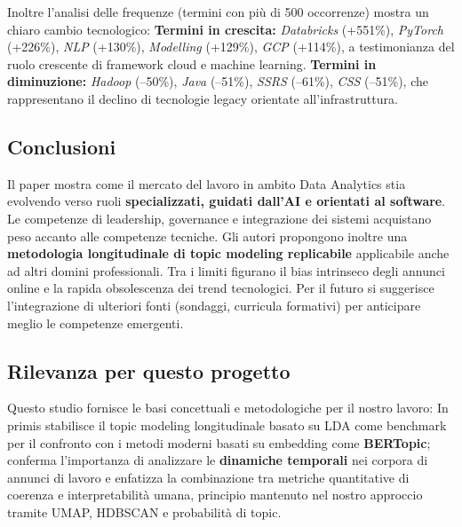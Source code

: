 Inoltre l'analisi delle frequenze (termini con più di 500 occorrenze) mostra un chiaro cambio tecnologico:
\noindent \textbf{Termini in crescita:} \textit{Databricks} (+551\%), \textit{PyTorch} (+226\%), \textit{NLP} (+130\%), \textit{Modelling} (+129\%), \textit{GCP} (+114\%), a testimonianza del ruolo crescente di framework cloud e machine learning.
\noindent \textbf{Termini in diminuzione:} \textit{Hadoop} (--50\%), \textit{Java} (--51\%), \textit{SSRS} (--61\%), \textit{CSS} (--51\%), che rappresentano il declino di tecnologie legacy orientate all'infrastruttura.

\subsection{Conclusioni}
Il paper mostra come il mercato del lavoro in ambito Data Analytics stia evolvendo verso ruoli \textbf{specializzati, guidati dall'AI e orientati al software}.
Le competenze di leadership, governance e integrazione dei sistemi acquistano peso accanto alle competenze tecniche.
Gli autori propongono inoltre una \textbf{metodologia longitudinale di topic modeling replicabile} applicabile anche ad altri domini professionali.
Tra i limiti figurano il bias intrinseco degli annunci online e la rapida obsolescenza dei trend tecnologici.
Per il futuro si suggerisce l'integrazione di ulteriori fonti (sondaggi, curricula formativi) per anticipare meglio le competenze emergenti.

\subsection{Rilevanza per questo progetto}
Questo studio fornisce le basi concettuali e metodologiche per il nostro lavoro:
In primis stabilisce il topic modeling longitudinale basato su LDA come benchmark per il confronto con i metodi moderni basati su embedding come \textbf{BERTopic};
conferma l'importanza di analizzare le \textbf{dinamiche temporali} nei corpora di annunci di lavoro e enfatizza la combinazione tra metriche quantitative di coerenza e interpretabilità umana, principio mantenuto nel nostro approccio tramite UMAP, HDBSCAN e probabilità di topic.